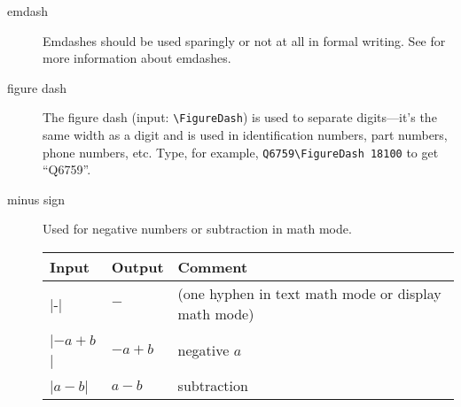 \begin{description}
  \item[emdash]
    Emdashes should be used sparingly
    or not at all in formal writing.
    See 
    \cite{cmos17-emdash,wikipedia-emdash}
    for more information about emdashes.

  \item[figure dash]
    The figure dash
    (input: \verb|\FigureDash|)
    is used to separate digits---it's the same width
    as a digit and is used in identification numbers,
    part numbers,
    phone numbers, etc.
    Type, for example, \verb|Q6759\FigureDash 18100|
    to get ``Q6759''.

  \item[minus sign]
    Used for negative numbers or subtraction in math mode.
    \begin{inlinetable}
      \begin{tabular}{@{}lll@{}}
        \toprule
        \textbf{Input}& \textbf{Output}& \textbf{Comment}\\
        \midrule
        |-|& \(-\)& (one hyphen in text math mode or display math mode)\\
        |\(-a + b\)|& \(-a + b\)& negative $a$\\
        |\(a - b\)|& \(a - b\)& subtraction\\
        \bottomrule
      \end{tabular}
    \end{inlinetable}

\end{description}

